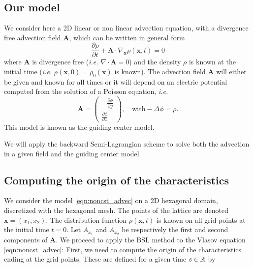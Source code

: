 \documentclass[proc]{edpsmath}
\begin{document}
\subsection{Our model}

We consider here a 2D linear or non linear advection equation, with a divergence free advection field $ \mathbf{A}$, which can be written in general form
\begin{equation}
	\dfrac{\partial \rho}{\partial t} + \mathbf{A} \cdot \nabla_{\mathbf{x}} \rho(\mathbf{x}, t)  = 0
	\label{eqn:noncst_advec}
\end{equation}
where $\mathbf{A}$ is divergence free (\emph{i.e.} $\nabla \cdot \mathbf{A} = 0$) and the density $\rho$ is known at the initial time (\emph{i.e.} $\rho(\mathbf{x}, 0) = \rho_0(\mathbf{x})$ is known). The advection field $ \mathbf{A}$ will either be given and known for all times or it will depend on an electric potential computed from the solution of a Poisson equation, \emph{i.e. } 
$$ \mathbf{A}= \begin{pmatrix}
-\frac{\partial \phi}{\partial y} \\ \frac{\partial \phi}{\partial x}
\end{pmatrix}
, ~~~\mbox{ with} -\Delta\phi = \rho.$$ 
This model is known as the guiding center model.

We will apply the backward Semi-Lagrangian scheme to solve both the advection in a given field and the guiding center model.


\subsection{Computing the origin of the characteristics}



We consider the model \eqref{eqn:noncst_advec} on a 2D hexagonal domain, discretized with the hexagonal mesh. The points of the lattice are denoted $\mathbf{x}=(x_1, x_2)$. The distribution function $\rho(\mathbf{x},t)$ is known on all grid points at the initial time $t=0$. Let $A_{x_1}$ and $A_{x_2}$ be respectively the first and second components of $\mathbf{A}$. We proceed to apply the BSL method to the Vlasov equation \eqref{eqn:noncst_advec}: First, we need to compute the origin of the characteristics ending at the grid points. These are defined for  a given time $s \in \mathbb{R} $ by
\end{document}
